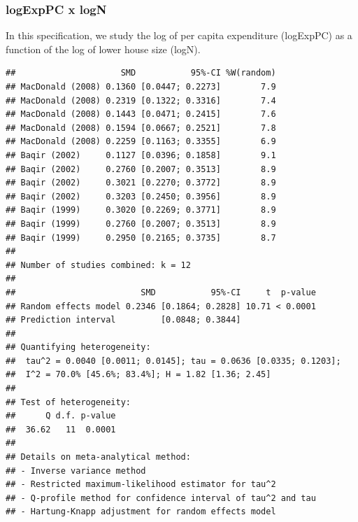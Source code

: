 \documentclass[
]{article}
\newenvironment{Shaded}{\begin{snugshade}}{\end{snugshade}}
\newcommand{\CommentTok}[1]{\textcolor[rgb]{0.56,0.35,0.01}{\textit{#1}}}
\newcommand{\DataTypeTok}[1]{\textcolor[rgb]{0.13,0.29,0.53}{#1}}
\newcommand{\KeywordTok}[1]{\textcolor[rgb]{0.13,0.29,0.53}{\textbf{#1}}}
\newcommand{\NormalTok}[1]{#1}
\newcommand{\OperatorTok}[1]{\textcolor[rgb]{0.81,0.36,0.00}{\textbf{#1}}}
\newcommand{\OtherTok}[1]{\textcolor[rgb]{0.56,0.35,0.01}{#1}}
\newcommand{\StringTok}[1]{\textcolor[rgb]{0.31,0.60,0.02}{#1}}
\begin{document}
\newpage

\hypertarget{logexppc-x-logn-1}{%
\subsubsection{logExpPC x logN}\label{logexppc-x-logn-1}}

In this specification, we study the log of per capita expenditure
(logExpPC) as a function of the log of lower house size (logN).

\begin{Shaded}
\end{Shaded}

\begin{verbatim}
##                     SMD           95%-CI %W(random)
## MacDonald (2008) 0.1360 [0.0447; 0.2273]        7.9
## MacDonald (2008) 0.2319 [0.1322; 0.3316]        7.4
## MacDonald (2008) 0.1443 [0.0471; 0.2415]        7.6
## MacDonald (2008) 0.1594 [0.0667; 0.2521]        7.8
## MacDonald (2008) 0.2259 [0.1163; 0.3355]        6.9
## Baqir (2002)     0.1127 [0.0396; 0.1858]        9.1
## Baqir (2002)     0.2760 [0.2007; 0.3513]        8.9
## Baqir (2002)     0.3021 [0.2270; 0.3772]        8.9
## Baqir (2002)     0.3203 [0.2450; 0.3956]        8.9
## Baqir (1999)     0.3020 [0.2269; 0.3771]        8.9
## Baqir (1999)     0.2760 [0.2007; 0.3513]        8.9
## Baqir (1999)     0.2950 [0.2165; 0.3735]        8.7
## 
## Number of studies combined: k = 12
## 
##                         SMD           95%-CI     t  p-value
## Random effects model 0.2346 [0.1864; 0.2828] 10.71 < 0.0001
## Prediction interval         [0.0848; 0.3844]               
## 
## Quantifying heterogeneity:
##  tau^2 = 0.0040 [0.0011; 0.0145]; tau = 0.0636 [0.0335; 0.1203];
##  I^2 = 70.0% [45.6%; 83.4%]; H = 1.82 [1.36; 2.45]
## 
## Test of heterogeneity:
##      Q d.f. p-value
##  36.62   11  0.0001
## 
## Details on meta-analytical method:
## - Inverse variance method
## - Restricted maximum-likelihood estimator for tau^2
## - Q-profile method for confidence interval of tau^2 and tau
## - Hartung-Knapp adjustment for random effects model
\end{verbatim}
\end{document}
